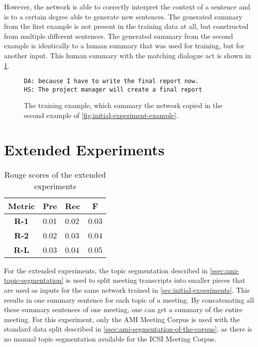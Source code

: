 However, the network is able to correctly interpret the context of a sentence and is to a certain degree able to generate new sentences.
The generated summary from the first example is not present in the training data at all, but constructed from multiple different sentences.
The generated summary from the second example is identically to a human summary that was used for training, but for another input.
This human summary with the matching dialogue act is shown in \cref{fig:initial-experiment-training-example}.

\begin{figure}[h]
\begin{lstlisting}[numbers=none]
DA: because I have to write the final report now.
HS: The project manager will create a final report
\end{lstlisting}
\caption{The training example, which summary the network copied in the second example of \cref{fig:initial-experiment-example}.}
\label{fig:initial-experiment-training-example}
\end{figure}


\section{Extended Experiments}

\begin{table}[h]
\centering
\begin{tabular}{@{}clll@{}}
\toprule
\textbf{Metric} & \multicolumn{1}{c}{\textbf{Pre}} & \multicolumn{1}{c}{\textbf{Rec}} & \multicolumn{1}{c}{\textbf{F}} \\ \midrule
\textbf{R-1}    & 0.01                             & 0.02                             & 0.03                           \\
\textbf{R-2}    & 0.02                             & 0.03                             & 0.04                           \\
\textbf{R-L}    & 0.03                             & 0.04                             & 0.05                           \\ \bottomrule
\end{tabular}
\caption{Rouge scores of the extended experiments}
\label{tab:extended-experiment-rouge}
\end{table}

For the extended experiments, the topic segmentation described in \cref{ssec:ami-topic-segmentation} is used to split meeting transcripts into smaller pieces that are used as inputs for the same network trained in \cref{sec:initial-experiments}.
This results in one summary sentence for each topic of a meeting.
By concatenating all these summary sentences of one meeting, one can get a summary of the entire meeting.
For this experiment, only the AMI Meeting Corpus is used with the standard data split described in \cref{ssec:ami-segmentation-of-the-corpus}, as there is no manual topic segmentation available for the ICSI Meeting Corpus.
